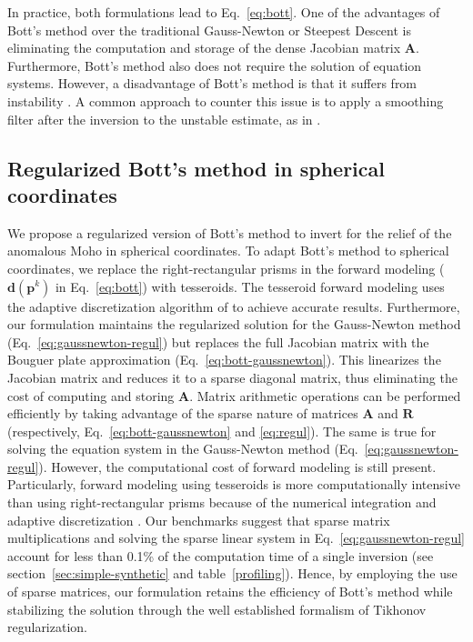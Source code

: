 \documentclass[extra]{gji}
\begin{document}
\noindent
In practice, both formulations lead to Eq.~\ref{eq:bott}.
One of the advantages of Bott's method over the traditional Gauss-Newton or
Steepest Descent is eliminating the computation and storage of the dense
Jacobian matrix $\mathbf{A}$.
Furthermore, Bott's method also does not require the solution of equation
systems.
However, a disadvantage of Bott's method is that it suffers from instability
\citep{silva2014}.
A common approach to counter this issue is to apply a smoothing filter after
the inversion to the unstable estimate, as in \citet{silva2014}.



\subsection{Regularized Bott's method in spherical coordinates}

We propose a regularized version of Bott's method to invert for the relief of
the anomalous Moho in spherical coordinates.
To adapt Bott's method to spherical coordinates,
we replace the right-rectangular prisms in the forward modeling
($\mathbf{d}(\mathbf{p}^k)$ in Eq.~\ref{eq:bott})
with tesseroids.
The tesseroid forward modeling uses the adaptive discretization algorithm
of \citet{uieda2016} to achieve accurate results.
Furthermore, our formulation maintains the regularized solution
for the Gauss-Newton method (Eq.~\ref{eq:gaussnewton-regul})
but replaces the full Jacobian matrix with the Bouguer plate approximation
(Eq.~\ref{eq:bott-gaussnewton}).
This linearizes the Jacobian matrix and reduces it to a sparse diagonal matrix,
thus eliminating the cost of computing and storing $\mathbf{A}$.
Matrix arithmetic operations can be performed efficiently by taking advantage
of the sparse nature of matrices $\mathbf{A}$ and $\mathbf{R}$
(respectively, Eq.~\ref{eq:bott-gaussnewton} and \ref{eq:regul}).
The same is true for solving the equation system in the Gauss-Newton method
(Eq.~\ref{eq:gaussnewton-regul}).
However, the computational cost of forward modeling is still present.
Particularly, forward modeling using tesseroids is more computationally
intensive than using right-rectangular prisms
because of the numerical integration and adaptive discretization
\citep{uieda2016}.
Our benchmarks suggest that
sparse matrix multiplications and solving the sparse linear system
in Eq.~\ref{eq:gaussnewton-regul}
account for less than 0.1\%
of the computation time of a single inversion
(see section~\ref{sec:simple-synthetic} and table~\ref{profiling}).
Hence, by employing the use of sparse matrices,
our formulation retains the efficiency of Bott's method
while stabilizing the solution through the well established formalism of
Tikhonov regularization.
\end{document}
